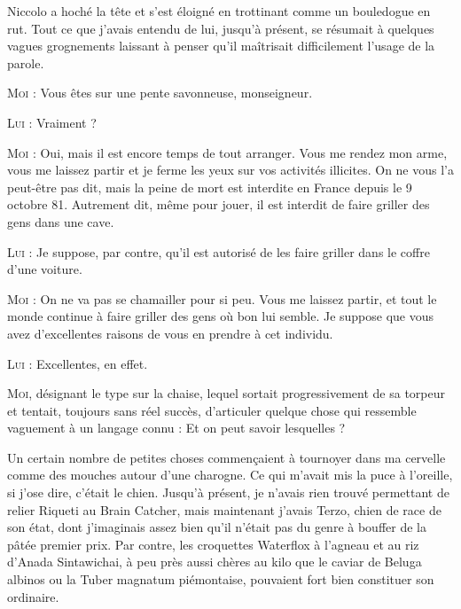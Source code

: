 Niccolo a hoché la tête et s’est éloigné en trottinant comme un bouledogue en rut. Tout ce que j’avais entendu de lui, jusqu’à présent, se résumait à quelques vagues grognements laissant à penser qu’il maîtrisait difficilement l’usage de la parole.

\begin{dialogue}

\textsc{Moi} : Vous êtes sur une pente savonneuse, monseigneur.

\textsc{Lui} : Vraiment ?

\textsc{Moi} : Oui, mais il est encore temps de tout arranger. Vous me rendez mon arme, vous me laissez partir et je ferme les yeux sur vos activités illicites. On ne vous l’a peut-être pas dit, mais la peine de mort est interdite en France depuis le 9 octobre 81. Autrement dit, même pour jouer, il est interdit de faire griller des gens dans une cave.

\textsc{Lui} : Je suppose, par contre, qu’il est autorisé de les faire griller dans le coffre d’une voiture.

\textsc{Moi} : On ne va pas se chamailler pour si peu. Vous me laissez partir, et tout le monde continue à faire griller des gens où bon lui semble. Je suppose que vous avez d’excellentes raisons de vous en prendre à cet individu.

\textsc{Lui} : Excellentes, en effet.

\textsc{Moi}, désignant le type sur la chaise, lequel sortait progressivement de sa torpeur et tentait, toujours sans réel succès, d’articuler quelque chose qui ressemble vaguement à un langage connu : Et on peut savoir lesquelles ?

Un certain nombre de petites choses commençaient à tournoyer dans ma cervelle comme des mouches autour d’une charogne. Ce qui m’avait mis la puce à l’oreille, si j’ose dire, c’était le chien. Jusqu’à présent, je n’avais rien trouvé permettant de relier Riqueti au Brain Catcher, mais maintenant j’avais Terzo, chien de race de son état, dont j’imaginais assez bien qu’il n’était pas du genre à bouffer de la pâtée premier prix. Par contre, les croquettes Waterflox à l’agneau et au riz d’Anada Sintawichai, à peu près aussi chères au kilo que le caviar de Beluga albinos ou la Tuber magnatum piémontaise, pouvaient fort bien constituer son ordinaire.


\end{dialogue}
